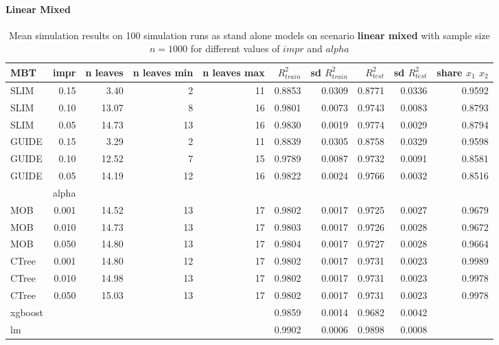 \paragraph{Linear Mixed}
\begin{table}[!htb]
\caption{Mean simulation results on 100 simulation runs as stand alone models on scenario \textbf{linear mixed} with sample size $n = 1000$ for different values of $impr$ and $alpha$}
\centering \tiny
\begin{tabular}[t]{l|r|r|r|r|r|r|r|r|r}
\hline


MBT & impr  & n leaves & n leaves min & n leaves max & $R^2_{train}$ & sd $R^2_{train}$ & $R^2_{test}$ & sd $R^2_{test}$ & share $x_1$ $x_2$\\
\hline

SLIM & 0.15 & 3.40 & 2 & 11 & 0.8853 & 0.0309 & 0.8771 & 0.0336 & 0.9592\\
SLIM & 0.10 & 13.07 & 8 & 16 & 0.9801 & 0.0073 & 0.9743 & 0.0083 & 0.8793\\
SLIM & 0.05 & 14.73 & 13 & 16 & 0.9830 & 0.0019 & 0.9774 & 0.0029 & 0.8794\\
GUIDE & 0.15 & 3.29 & 2 & 11 & 0.8839 & 0.0305 & 0.8758 & 0.0329 & 0.9598\\
GUIDE & 0.10 & 12.52 & 7 & 15 & 0.9789 & 0.0087 & 0.9732 & 0.0091 & 0.8581\\
GUIDE & 0.05 & 14.19 & 12 & 16 & 0.9822 & 0.0024 & 0.9766 & 0.0032 & 0.8516\\

\hline

& alpha & & & & & & & \\
\hline

MOB & 0.001 & 14.52 & 13 & 17 & 0.9802 & 0.0017 & 0.9725 & 0.0027 & 0.9679\\
MOB & 0.010 & 14.73 & 13 & 17 & 0.9803 & 0.0017 & 0.9726 & 0.0028 & 0.9672\\
MOB & 0.050 & 14.80 & 13 & 17 & 0.9804 & 0.0017 & 0.9727 & 0.0028 & 0.9664\\

CTree & 0.001 & 14.80 & 12 & 17 & 0.9802 & 0.0017 & 0.9731 & 0.0023 & 0.9989\\
CTree & 0.010 & 14.98 & 13 & 17 & 0.9802 & 0.0017 & 0.9731 & 0.0023 & 0.9978\\
CTree & 0.050 & 15.03 & 13 & 17 & 0.9802 & 0.0017 & 0.9731 & 0.0023 & 0.9978\\
\hline

xgboost & & & & & 0.9859 & 0.0014 & 0.9682 & 0.0042 &\\
lm & & & & & 0.9902 & 0.0006 & 0.9898 & 0.0008 &\\
\hline


\end{tabular}
\label{tab:linear_mixed_summary}
\end{table}

